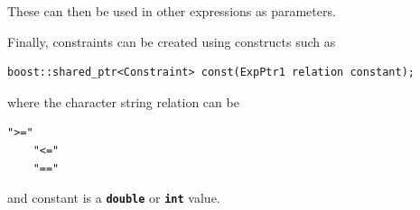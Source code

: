These can then be used in other expressions as parameters.

Finally, constraints can be created using constructs such as

{
\color{red}
\begin{Verbatim}[fontseries=b]
boost::shared_ptr<Constraint> const(ExpPtr1 relation constant);
\end{Verbatim}
}

where the character string relation can be

{
\color{red}
\begin{Verbatim}[fontseries=b]
    ">="
    "<="
    "=="
\end{Verbatim}
}

and constant is a \texttt{\textbf{double}} or \texttt{\textbf{int}} value.
\newline
\hyperlink{topDoc}{\color{blue}{Top}}
